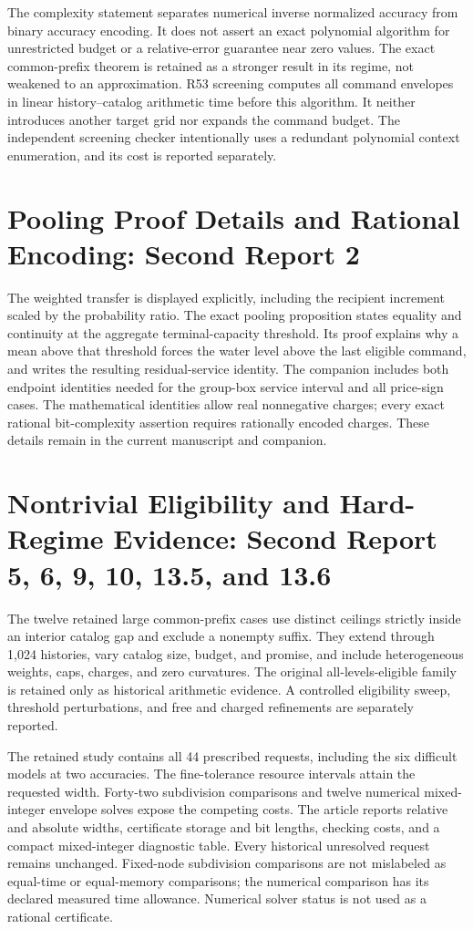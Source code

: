 The complexity statement separates numerical inverse normalized accuracy from binary accuracy encoding. It does not assert an exact polynomial algorithm for unrestricted budget or a relative-error guarantee near zero values. The exact common-prefix theorem is retained as a stronger result in its regime, not weakened to an approximation. R53 screening computes all command envelopes in linear history--catalog arithmetic time before this algorithm. It neither introduces another target grid nor expands the command budget. The independent screening checker intentionally uses a redundant polynomial context enumeration, and its cost is reported separately.

\section{Pooling Proof Details and Rational Encoding: Second Report 2}
The weighted transfer is displayed explicitly, including the recipient increment scaled by the probability ratio. The exact pooling proposition states equality and continuity at the aggregate terminal-capacity threshold. Its proof explains why a mean above that threshold forces the water level above the last eligible command, and writes the resulting residual-service identity. The companion includes both endpoint identities needed for the group-box service interval and all price-sign cases. The mathematical identities allow real nonnegative charges; every exact rational bit-complexity assertion requires rationally encoded charges. These details remain in the current manuscript and companion.

\section{Nontrivial Eligibility and Hard-Regime Evidence: Second Report 5, 6, 9, 10, 13.5, and 13.6}
The twelve retained large common-prefix cases use distinct ceilings strictly inside an interior catalog gap and exclude a nonempty suffix. They extend through 1,024 histories, vary catalog size, budget, and promise, and include heterogeneous weights, caps, charges, and zero curvatures. The original all-levels-eligible family is retained only as historical arithmetic evidence. A controlled eligibility sweep, threshold perturbations, and free and charged refinements are separately reported.

The retained study contains all 44 prescribed requests, including the six difficult models at two accuracies. The fine-tolerance resource intervals attain the requested width. Forty-two subdivision comparisons and twelve numerical mixed-integer envelope solves expose the competing costs. The article reports relative and absolute widths, certificate storage and bit lengths, checking costs, and a compact mixed-integer diagnostic table. Every historical unresolved request remains unchanged. Fixed-node subdivision comparisons are not mislabeled as equal-time or equal-memory comparisons; the numerical comparison has its declared measured time allowance. Numerical solver status is not used as a rational certificate.


